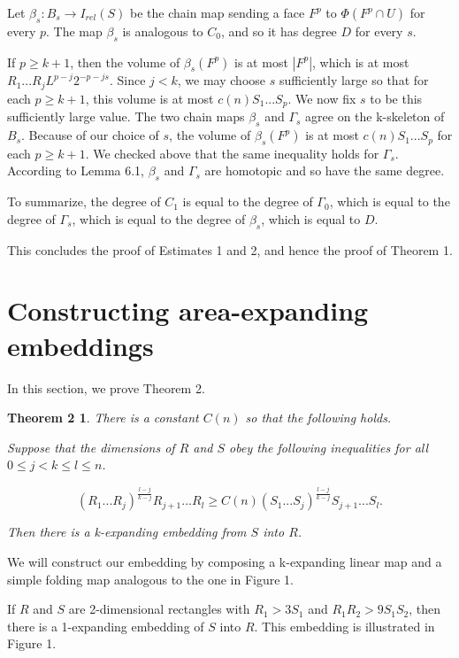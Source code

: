 \documentclass{amsart}
\newtheorem*{Theorem 1}{Theorem 1}
\newtheorem*{Theorem 2}{Theorem 2}
\newtheorem*{Estimate 1}{Estimate 1}
\newtheorem*{Estimate 2}{Estimate 2}
\newtheorem*{key lemma}{Key Lemma}
\numberwithin{equation}{section}
\begin{document}
Let $\beta_s: B_s \rightarrow I_{rel}(S)$ be the chain map
sending a face $F^p$ to $\Phi(F^p \cap U)$ for every $p$.  The map
$\beta_s$ is analogous to $C_0$, and so it has degree $D$ for
every $s$.

If $p \ge k+1$, then the volume of $\beta_s(F^p)$ is at most
$|F^p|$, which is at most $R_1 ... R_j L^{p-j} 2^{-{p-j}s}$. 
Since $j < k$, we may choose $s$ sufficiently large so that for
each $p \ge k+1$, this volume is at most $c(n) S_1 ... S_p$.  
We now fix $s$ to be this sufficiently large value. The
two chain maps $\beta_s$ and $\Gamma_s$ agree on the k-skeleton
of $B_s$.  Because of our choice of $s$, the volume of
$\beta_s(F^p)$ is at most $c(n) S_1 ... S_p$ for each $p \ge
k+1$.  We checked above that the same inequality holds for
$\Gamma_s$.  According to Lemma 6.1, $\beta_s$ and
$\Gamma_s$ are homotopic and so have the same degree.

To summarize, the degree of $C_1$ is equal to the degree of
$\Gamma_0$, which is equal to the degree of $\Gamma_s$, which is
equal to the degree of $\beta_s$, which is equal to $D$.
\endproof

This concludes the proof of Estimates 1 and 2, and hence the
proof of Theorem 1.



\section{Constructing area-expanding embeddings}

In this section, we prove Theorem 2.

\begin{Theorem 2} There is a constant $C(n)$ so
that the following holds.

Suppose that the dimensions of $R$ and $S$ obey the following
inequalities for all $0 \le j < k \le l \le n$.

$$ (R_1 ... R_j)^{\frac{l-j}{k-j}} R_{j+1} ... R_l \ge C(n) (S_1
... S_j)^{\frac{l-j}{k-j}} S_{j+1} ... S_l. $$

Then there is a k-expanding embedding from $S$ into $R$.

\end{Theorem 2}

We will construct our embedding by composing a
k-expanding linear map and a simple folding map
analogous to the one in Figure 1.

If $R$ and $S$
are 2-dimensional rectangles with $R_1 > 3 S_1$ and $R_1 R_2 > 9 S_1
S_2$, then there is a 1-expanding embedding of $S$ into $R$.
This embedding is illustrated in Figure 1.
\end{document}
